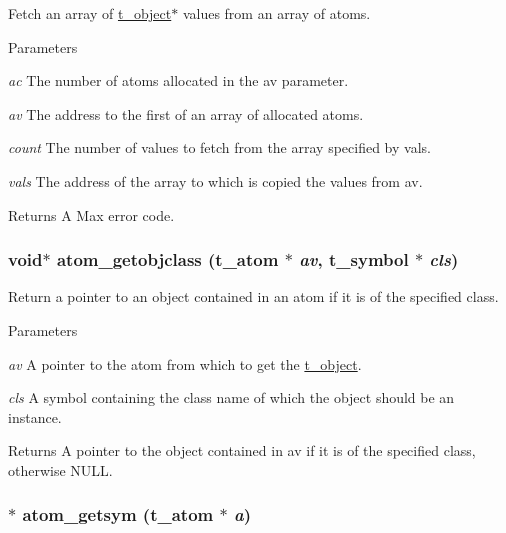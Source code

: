 Fetch an array of \hyperlink{structt__object}{t\_\-object}$\ast$ values from an array of atoms. 
\begin{DoxyParams}{Parameters}
\item[{\em ac}]The number of atoms allocated in the av parameter. \item[{\em av}]The address to the first of an array of allocated atoms. \item[{\em count}]The number of values to fetch from the array specified by vals. \item[{\em vals}]The address of the array to which is copied the values from av. \end{DoxyParams}
\begin{DoxyReturn}{Returns}
A Max error code. 
\end{DoxyReturn}
\hypertarget{group__atom_ga10405190b0d5dbec546086aec6634c9d}{
\subsubsection[{atom\_\-getobjclass}]{\setlength{\rightskip}{0pt plus 5cm}void$\ast$ atom\_\-getobjclass ({\bf t\_\-atom} $\ast$ {\em av}, \/  {\bf t\_\-symbol} $\ast$ {\em cls})}}
\label{group__atom_ga10405190b0d5dbec546086aec6634c9d}


Return a pointer to an object contained in an atom if it is of the specified class. 
\begin{DoxyParams}{Parameters}
\item[{\em av}]A pointer to the atom from which to get the \hyperlink{structt__object}{t\_\-object}. \item[{\em cls}]A symbol containing the class name of which the object should be an instance. \end{DoxyParams}
\begin{DoxyReturn}{Returns}
A pointer to the object contained in av if it is of the specified class, otherwise NULL. 
\end{DoxyReturn}
\hypertarget{group__atom_gab43922b60c9c2aaf3a4ecabaa432ef61}{
\subsubsection[{atom\_\-getsym}]{$\ast$ atom\_\-getsym ({\bf t\_\-atom} $\ast$ {\em a})}}
\label{group__atom_gab43922b60c9c2aaf3a4ecabaa432ef61}



